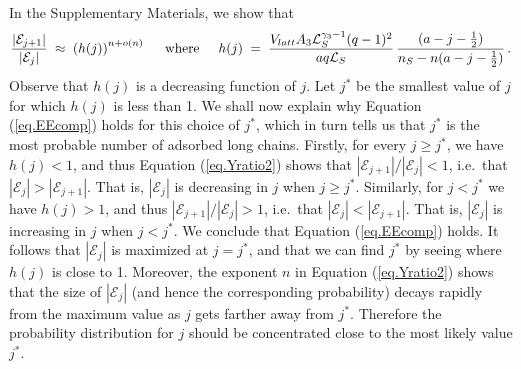 \documentclass[journal=mamobx,manuscript=article]{achemso}
\newcommand{\leng}{\mathcal{L}}
\begin{document}
In the Supplementary Materials, we show that
\begin{equation}
    \label{eq.Yratio2}
       \frac{|\mathcal{E}_{j+1}|}{|\mathcal{E}_j|} \; \approx \; \left( h(j)\right)^{n+o(n)}
       \hspace{5mm}\hbox{where}\hspace{5mm}
      h(j) \;=\;  \frac{ V_{latt}A_3\leng_S^{\gamma_3-1}(q-1)^2}{aq\leng_S} \,
          \frac{(a-j-\frac{1}{2})}{n_S-n(a-j-\frac{1}{2})}   \,.
\end{equation}
Observe that $h(j)$ is a  decreasing function of $j$.
Let $j^*$ be the smallest value of $j$ for which 
$h(j)$ is less than 1. 
We shall now explain why Equation (\ref{eq.EEcomp}) holds 
for this choice of $j^*$, which in turn tells us that
$j^*$ is the most probable 
number of adsorbed long chains.
Firstly, for every $j\geq j^*$, we have $h(j)<1$, 
and thus Equation (\ref{eq.Yratio2}) shows that 
$|\mathcal{E}_{j+1}|/|\mathcal{E}_j|<1$, i.e.\ that 
$|\mathcal{E}_j|>|\mathcal{E}_{j+1}|$.  That is, $|\mathcal{E}_j|$ is decreasing in $j$ when $j\geq j^*$.  
Similarly, for $j<j^*$ we have $h(j)>1$, and thus
$|\mathcal{E}_{j+1}|/|\mathcal{E}_j|> 1$, i.e.\ that
$|\mathcal{E}_j|<|\mathcal{E}_{j+1}|$.  That is, $|\mathcal{E}_j|$ is increasing in $j$ when $j< j^*$.
We conclude that Equation (\ref{eq.EEcomp}) holds.
It follows that $|\mathcal{E}_j|$ is maximized at $j=j^*$, and that we can find $j^*$ by seeing 
where $h(j)$
is close to 1.   
Moreover, the exponent $n$ in Equation (\ref{eq.Yratio2})
shows that the size of $|\mathcal{E}_j|$  (and hence the 
corresponding probability) decays rapidly from the maximum 
value as $j$ gets farther away from $j^*$.  Therefore the probability distribution for $j$ should be concentrated close to the most likely value $j^*$.
\end{document}
